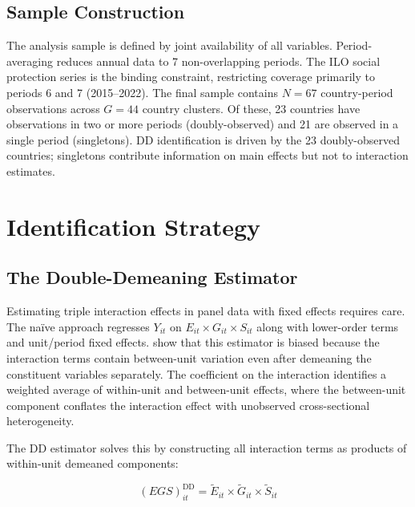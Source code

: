 \documentclass[11pt,letterpaper]{article}
\begin{document}
\subsection{Sample Construction}

The analysis sample is defined by joint availability of all variables. Period-averaging reduces
annual data to 7 non-overlapping periods. The ILO social protection series is the binding
constraint, restricting coverage primarily to periods 6 and 7 (2015--2022). The final sample
contains $N = 67$ country-period observations across $G = 44$ country clusters. Of these, 23
countries have observations in two or more periods (doubly-observed) and 21 are observed in a
single period (singletons). DD identification is driven by the 23 doubly-observed countries;
singletons contribute information on main effects but not to interaction estimates.

\section{Identification Strategy}
\label{sec:identification}

\subsection{The Double-Demeaning Estimator}

Estimating triple interaction effects in panel data with fixed effects requires care. The na\"{i}ve
approach regresses $Y_{it}$ on $E_{it} \times G_{it} \times S_{it}$ along with lower-order terms
and unit/period fixed effects. \citet{Giesselmann2022} show that this estimator is biased because
the interaction terms contain between-unit variation even after demeaning the constituent variables
separately. The coefficient on the interaction identifies a weighted average of within-unit and
between-unit effects, where the between-unit component conflates the interaction effect with
unobserved cross-sectional heterogeneity.

The DD estimator solves this by constructing all interaction terms as products of within-unit
demeaned components:

\begin{equation}
  (EGS)^\text{DD}_{it} = \widetilde{E}_{it} \times \widetilde{G}_{it} \times \widetilde{S}_{it}
\end{equation}
\end{document}
